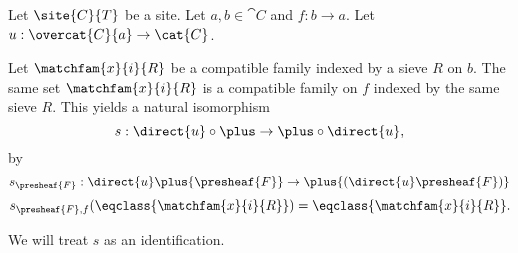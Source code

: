 \begin{definition}
Let $\site{C}{T}$ be a site.
Let $a,b \in \cat{C}$ 
and $f:b\rightarrow a$.
Let $u:\overcat{C}{a} \rightarrow \cat{C}$.

Let $\matchfam{x}{i}{R}$ be a compatible family 
indexed by a sieve $R$ on $b$.
The same set $\matchfam{x}{i}{R}$ is a compatible family 
on $f$ indexed by the same sieve $R$.
This yields a natural isomorphism
\[s: \direct{u} \circ \plus \rightarrow \plus \circ \direct{u},\] 
by
\[s_{\presheaf{F}}: \direct{u} \plus{\presheaf{F}} \rightarrow \plus{(\direct{u} \presheaf{F})}\]
\[s_{\presheaf{F},f}(\eqclass{\matchfam{x}{i}{R}}) = \eqclass{\matchfam{x}{i}{R}}.\]

We will treat $s$ as an identification.
\end{definition}

